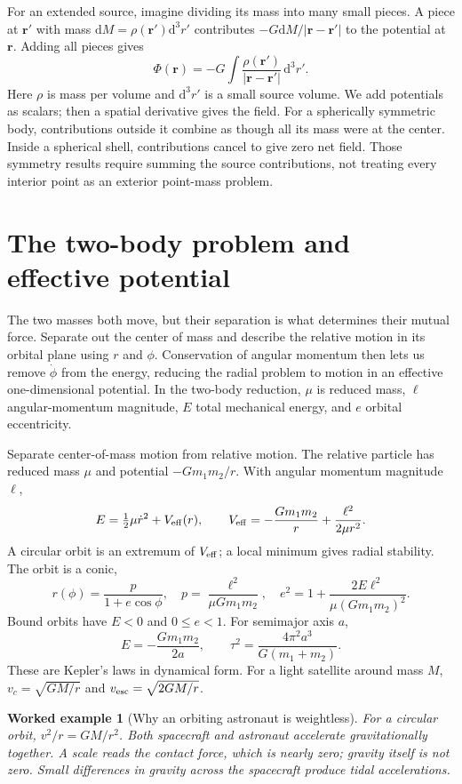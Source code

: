 \documentclass[11pt,oneside]{book}
\newcommand{\dd}{\mathrm{d}}
\newcommand{\vect}[1]{\boldsymbol{#1}}
\theoremstyle{reviewstyle}
\newtheorem{example}{Worked example}[chapter]
\begin{document}
For an extended source, imagine dividing its mass into many small pieces. A piece at $\vect r'$ with mass $\dd M=\rho(\vect r')\dd^3r'$ contributes $-G\dd M/|\vect r-\vect r'|$ to the potential at $\vect r$. Adding all pieces gives
\begin{equation}
\Phi(\vect r)=-G\int\frac{\rho(\vect r')}{|\vect r-\vect r'|}\,\dd^3r'.
\end{equation}
Here $\rho$ is mass per volume and $\dd^3r'$ is a small source volume. We add potentials as scalars; then a spatial derivative gives the field. For a spherically symmetric body, contributions outside it combine as though all its mass were at the center. Inside a spherical shell, contributions cancel to give zero net field. Those symmetry results require summing the source contributions, not treating every interior point as an exterior point-mass problem.

\section{The two-body problem and effective potential}
The two masses both move, but their separation is what determines their mutual force. Separate out the center of mass and describe the relative motion in its orbital plane using $r$ and $\phi$. Conservation of angular momentum then lets us remove $\dot\phi$ from the energy, reducing the radial problem to motion in an effective one-dimensional potential. In the two-body reduction, $\mu$ is reduced mass, $\ell$ angular-momentum magnitude, $E$ total mechanical energy, and $e$ orbital eccentricity.

Separate center-of-mass motion from relative motion. The relative particle has reduced mass $\mu$ and potential $-Gm_1m_2/r$. With angular momentum magnitude $\ell$,
\begin{equation}
E=\tfrac12\mu\dot r^2+V_{\rm eff}(r),\qquad
V_{\rm eff}=-\frac{Gm_1m_2}{r}+\frac{\ell^2}{2\mu r^2}.
\end{equation}
A circular orbit is an extremum of $V_{\rm eff}$; a local minimum gives radial stability. The orbit is a conic,
\begin{equation}
r(\phi)=\frac{p}{1+e\cos\phi},\quad
p=\frac{\ell^2}{\mu Gm_1m_2},\quad
e^2=1+\frac{2E\ell^2}{\mu(Gm_1m_2)^2}.
\end{equation}
Bound orbits have $E<0$ and $0\leq e<1$. For semimajor axis $a$,
\begin{equation}
E=-\frac{Gm_1m_2}{2a},\qquad
\tau^2=\frac{4\pi^2a^3}{G(m_1+m_2)}.
\end{equation}
These are Kepler's laws in dynamical form. For a light satellite around mass $M$,
$v_c=\sqrt{GM/r}$ and $v_{\rm esc}=\sqrt{2GM/r}$.
\begin{example}[Why an orbiting astronaut is weightless]
For a circular orbit, $v^2/r=GM/r^2$. Both spacecraft and astronaut accelerate gravitationally together. A scale reads the contact force, which is nearly zero; gravity itself is not zero. Small differences in gravity across the spacecraft produce tidal accelerations.
\end{example}
\end{document}
